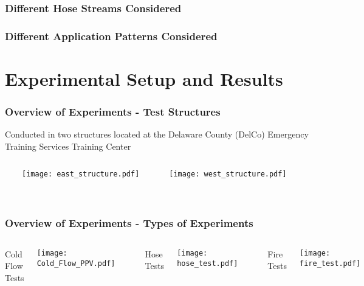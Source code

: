 \documentclass[t]{beamer}
\begin{document}
\begin{frame}
\frametitle{Different Hose Streams Considered}
\centerline{}
\end{frame} 

\begin{frame}%
\frametitle{Different Application Patterns Considered}
\centerline{}
\end{frame}

\section{Experimental Setup and Results}

\begin{frame}
\frametitle{Overview of Experiments - Test Structures}
Conducted in two structures located at the Delaware County (DelCo) Emergency Training Services Training Center
	\begin{columns}
    	\column{.5\framewidth}
    	\\~\\
		\centerline{\texttt{[image: east\_structure.pdf]}}
    	\column{.5\framewidth}
    	\\~\\
		\centerline{\texttt{[image: west\_structure.pdf]}}
	\end{columns}
\end{frame}

\begin{frame}
\frametitle{Overview of Experiments - Types of Experiments}
\vspace{\baselineskip}	
\vspace{\baselineskip}
	\begin{columns}%
		\column{.33\framewidth}
		\centerline{Cold Flow Tests}
		\centerline{\texttt{[image: Cold\_Flow\_PPV.pdf]}}	
		\\~\\ \pause
    	\column{.33\framewidth}
		\centerline{Hose Tests}
		\centerline{\texttt{[image: hose\_test.pdf]}}
		\\~\\ \pause
		\column{.33\framewidth}
		\centerline{Fire Tests}
		\centerline{\texttt{[image: fire\_test.pdf]}}
	\end{columns}
\end{frame}
\end{document}
